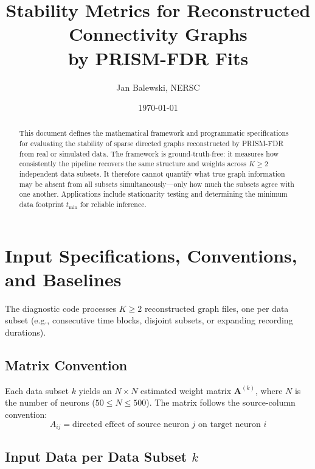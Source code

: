 \documentclass[11pt]{article}
\title{Stability Metrics for Reconstructed Connectivity Graphs\\by PRISM-FDR Fits}
\author{Jan Balewski, NERSC}
\date{\today}
\begin{document}
\maketitle

\begin{abstract}
This document defines the mathematical framework and programmatic specifications for evaluating the stability of sparse directed graphs reconstructed by PRISM-FDR from real or simulated data. The framework is ground-truth-free: it measures how consistently the pipeline recovers the same structure and weights across $K \ge 2$ independent data subsets. It therefore cannot quantify what true graph information may be absent from all subsets simultaneously---only how much the subsets agree with one another. Applications include stationarity testing and determining the minimum data footprint $t_{\text{min}}$ for reliable inference.
\end{abstract}

\tableofcontents

\section{Input Specifications, Conventions, and Baselines}

The diagnostic code processes $K \ge 2$ reconstructed graph files, one per data subset (e.g., consecutive time blocks, disjoint subsets, or expanding recording durations).

\subsection*{Matrix Convention}

Each data subset $k$ yields an $N \times N$ estimated weight matrix $\mathbf{A}^{(k)}$, where $N$ is the number of neurons ($50 \le N \le 500$). The matrix follows the source-column convention:
\[
A_{ij} = \text{directed effect of source neuron } j \text{ on target neuron } i
\]

\subsection*{Input Data per Data Subset $k$}
\end{document}
